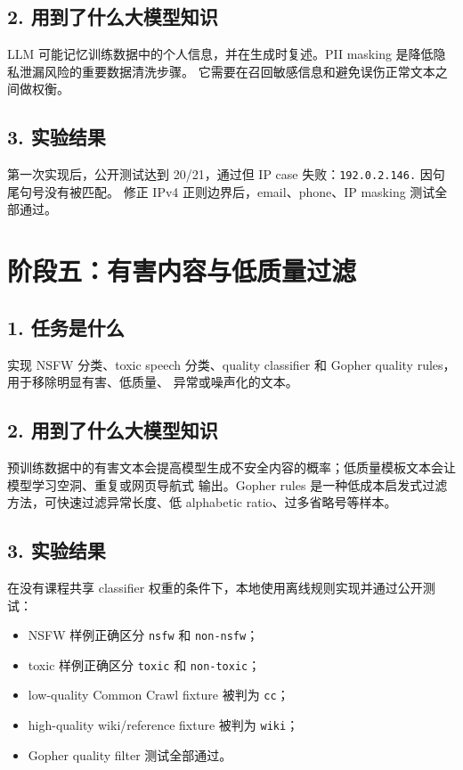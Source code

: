\documentclass[UTF8,11pt]{ctexart}
\begin{document}
\subsection*{2. 用到了什么大模型知识}

LLM 可能记忆训练数据中的个人信息，并在生成时复述。PII masking 是降低隐私泄漏风险的重要数据清洗步骤。
它需要在召回敏感信息和避免误伤正常文本之间做权衡。

\subsection*{3. 实验结果}

第一次实现后，公开测试达到 20/21，通过但 IP case 失败：\texttt{192.0.2.146.} 因句尾句号没有被匹配。
修正 IPv4 正则边界后，email、phone、IP masking 测试全部通过。

\section{阶段五：有害内容与低质量过滤}

\subsection*{1. 任务是什么}

实现 NSFW 分类、toxic speech 分类、quality classifier 和 Gopher quality rules，用于移除明显有害、低质量、
异常或噪声化的文本。

\subsection*{2. 用到了什么大模型知识}

预训练数据中的有害文本会提高模型生成不安全内容的概率；低质量模板文本会让模型学习空洞、重复或网页导航式
输出。Gopher rules 是一种低成本启发式过滤方法，可快速过滤异常长度、低 alphabetic ratio、过多省略号等样本。

\subsection*{3. 实验结果}

在没有课程共享 classifier 权重的条件下，本地使用离线规则实现并通过公开测试：

\begin{itemize}
  \item NSFW 样例正确区分 \texttt{nsfw} 和 \texttt{non-nsfw}；
  \item toxic 样例正确区分 \texttt{toxic} 和 \texttt{non-toxic}；
  \item low-quality Common Crawl fixture 被判为 \texttt{cc}；
  \item high-quality wiki/reference fixture 被判为 \texttt{wiki}；
  \item Gopher quality filter 测试全部通过。
\end{itemize}
\end{document}

